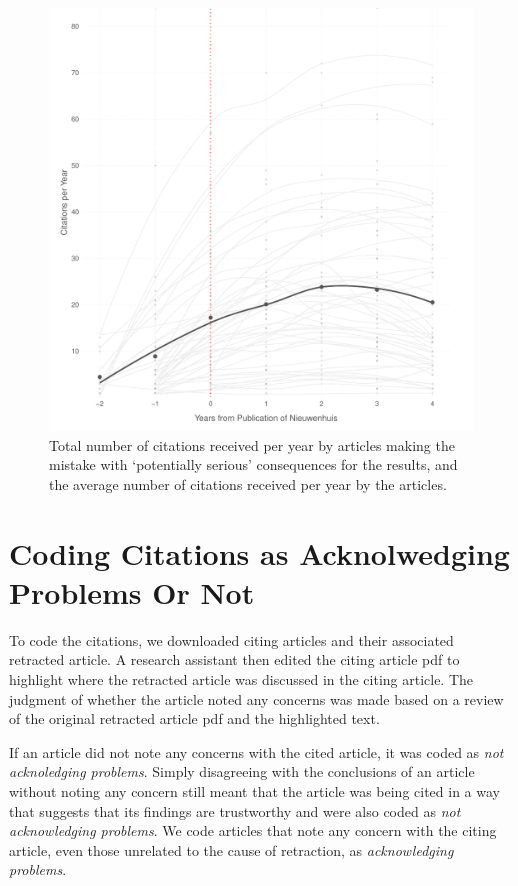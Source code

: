 \documentclass[12pt, letterpaper]{article}
\begin{document}
\clearpage
\begin{figure}[H]
\centering
\includegraphics[scale=.7]{../figs/serious_nw_growth_curve.pdf}
\caption{Total number of citations received per year by articles making the mistake with `potentially serious' consequences for the results, and the average number of citations received per year by the articles.}
\label{fig:serious_niewenhuis}
\end{figure}

\clearpage


\clearpage
\section{Coding Citations as Acknolwedging Problems Or Not}
\label{approving_or_not}
To code the citations, we downloaded citing articles and their associated retracted article. A research assistant then edited the citing article pdf to highlight where the retracted article was discussed in the citing article. The judgment of whether the article noted any concerns was made based on a review of the original retracted article pdf and the highlighted text. 

If an article did not note any concerns with the cited article, it was coded as \textit{not acknoledging problems}. Simply disagreeing with the conclusions of an article without noting any concern still meant that the article was being cited in a way that suggests that its findings are trustworthy and were also coded as \textit{not acknowledging problems}. We code articles that note any concern with the citing article, even those unrelated to the cause of retraction, as \textit{acknowledging problems}. 
\end{document}

